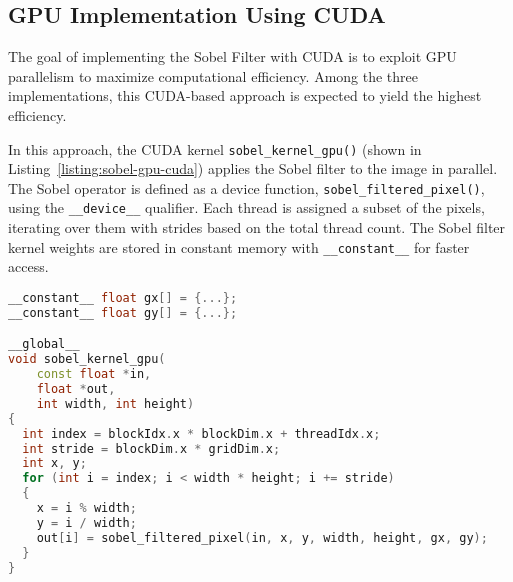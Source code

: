 \subsection{GPU Implementation Using CUDA}
\label{subsec:gpu-cuda}

The goal of implementing the Sobel Filter with CUDA is to exploit GPU parallelism to maximize computational efficiency. Among the three implementations, this CUDA-based approach is expected to yield the highest efficiency.

In this approach, the CUDA kernel \texttt{sobel\_kernel\_gpu()} (shown in Listing~\ref{listing:sobel-gpu-cuda}) applies the Sobel filter to the image in parallel. The Sobel operator is defined as a device function, \texttt{sobel\_filtered\_pixel()}, using the \texttt{\_\_device\_\_} qualifier. Each thread is assigned a subset of the pixels, iterating over them with strides based on the total thread count. The Sobel filter kernel weights are stored in constant memory with \texttt{\_\_constant\_\_} for faster access.

\begin{lstlisting}[caption={\textbf{CUDA Implementation of Sobel Filtering.} The \texttt{sobel\_kernel\_gpu()} function applies the Sobel filter with strided access and utilizes constant memory for optimal GPU performance.},label={listing:sobel-gpu-cuda},float=htbp,style=mystyle,language=C++]
__constant__ float gx[] = {...};
__constant__ float gy[] = {...};

__global__
void sobel_kernel_gpu(
    const float *in,
    float *out,
    int width, int height)
{
  int index = blockIdx.x * blockDim.x + threadIdx.x;
  int stride = blockDim.x * gridDim.x;
  int x, y;
  for (int i = index; i < width * height; i += stride)
  {
    x = i % width;
    y = i / width;
    out[i] = sobel_filtered_pixel(in, x, y, width, height, gx, gy);
  }
}
\end{lstlisting}
